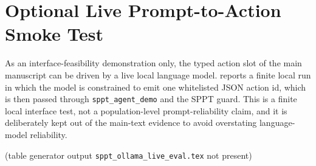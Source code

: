\documentclass[preprint,12pt,a4paper]{elsarticle}
\newcommand{\code}[1]{\texttt{#1}}
\begin{document}
\section{Optional Live Prompt-to-Action Smoke Test}\label{sup:ollama}

As an interface-feasibility demonstration only, the typed action slot of the main
manuscript can be driven by a live local language model. 
reports a finite local run in which the model is constrained to emit one
whitelisted JSON action id, which is then passed through \code{sppt\_agent\_demo}
and the SPPT guard. This is a finite local interface test, not a population-level
prompt-reliability claim, and it is deliberately kept out of the main-text
evidence to avoid overstating language-model reliability.

\begin{table}[H]
\centering
\caption{Optional live prompt-to-action smoke test for the SPPT typed action
interface.}
\label{sup:tab-ollama}
\scriptsize
{}%
  {\normalsize (table generator output \code{sppt\_ollama\_live\_eval.tex} not present)}
\end{table}
\end{document}
